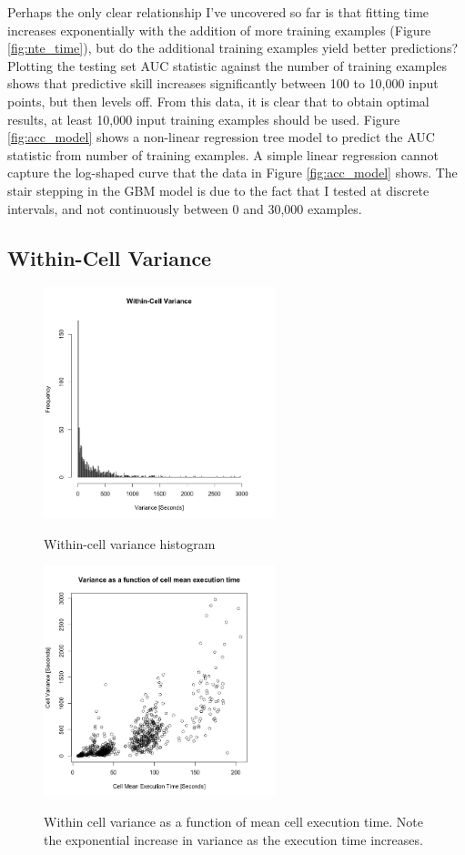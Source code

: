 \documentclass[a4paper]{article}
\begin{document}
Perhaps the only clear relationship I've uncovered so far is that fitting time increases exponentially with the addition of more training examples (Figure \ref{fig:nte_time}), but do the additional training examples yield better predictions?  Plotting the testing set AUC statistic against the number of training examples shows that predictive skill increases significantly between 100 to 10,000 input points, but then levels off.  From this data, it is clear that to obtain optimal results, at least 10,000 input training examples should be used.  Figure \ref{fig:acc_model} shows a non-linear regression tree model to predict the AUC statistic from number of training examples. A simple linear regression cannot capture the log-shaped curve that the data in Figure \ref{fig:acc_model} shows.  The stair stepping in the GBM model is due to the fact that I tested at discrete intervals, and not continuously between 0 and 30,000 examples.



\subsection{Within-Cell Variance}

\begin{figure}
\begin{centering}
\includegraphics[width=0.6\textwidth]{var_hist.png}
\caption{Within-cell variance histogram}\label{fig:var_hist}
\includegraphics[width=0.6\textwidth]{var_mean.png}
\caption{Within cell variance as a function of mean cell execution time.  Note the exponential increase in variance as the execution time increases.}\label{fig:var_mean}
\end{centering}
\end{figure}
\end{document}
